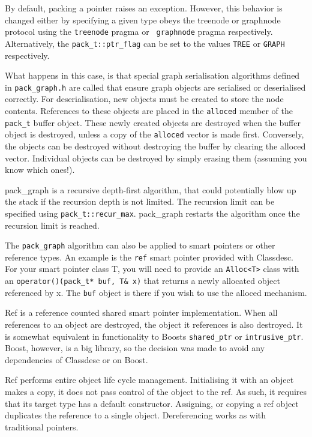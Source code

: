 By default, packing a pointer raises an exception. However, this
behavior is changed either by specifying a given type obeys the
treenode or graphnode protocol using the {\tt treenode}
pragma or {\tt
graphnode} pragma
respectively. Alternatively, the \verb+pack_t::ptr_flag+ can be set to
the values \verb+TREE+ or \verb+GRAPH+ respectively.

What happens in this case, is that special graph serialisation
algorithms defined in \verb+pack_graph.h+ are called that ensure graph
objects are serialised or deserialised correctly. For deserialisation,
new objects must be created to store the node contents. References to
these objects are placed in the \verb+alloced+ member
of the \verb+pack_t+ buffer object. These newly created objects are
destroyed when the buffer object is destroyed, unless a copy of the
\verb+alloced+ vector is made first. Conversely, the objects can be
destroyed without destroying the buffer by clearing the alloced
vector. Individual objects can be destroyed by simply erasing them
(assuming you know which ones!).

pack\_graph is a recursive depth-first algorithm, that could
potentially blow up the stack if the recursion depth is not
limited. The recursion limit can be specified using
\verb+pack_t::recur_max+. pack\_graph restarts the
algorithm once the recursion limit is reached.

The \verb+pack_graph+ algorithm can also be applied to smart pointers
or other reference types. An example is the \verb+ref+ smart pointer
provided with Classdesc. For your smart pointer class T, you will need to provide an \verb+Alloc<T>+
class with an \verb+operator()(pack_t* buf, T& x)+ that returns a
newly allocated object referenced by x. The \verb+buf+ object is there
if you wish to use the alloced mechanism.

\label{ref}

Ref is a reference counted shared smart pointer implementation. When
all references to an object are destroyed, the object it references is
also destroyed. It is somewhat equivalent in functionality to Boosts
\verb+shared_ptr+ or \verb+intrusive_ptr+. Boost, however, is a big
library, so the decision was made to avoid any dependencies of
Classdesc or \EcoLab{} on Boost.

Ref performs entire object life cycle management. Initialising it with
an object makes a copy, it does not pass control of the object to the
ref. As such, it requires that its target type has a default
constructor. Assigning, or copying a ref object duplicates the
reference to a single object. Dereferencing works as with traditional
pointers.

